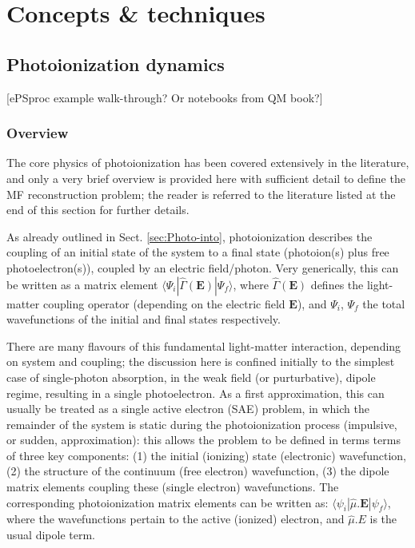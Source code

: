 \section{Concepts \& techniques\label{sec:Concepts}}

\subsection{Photoionization dynamics} 
[ePSproc example walk-through? Or notebooks from QM book?]

\subsubsection{Overview}
The core physics of photoionization has been covered extensively in the literature, and only a very brief overview is provided here with sufficient detail to define the MF reconstruction problem; the reader is referred to the literature listed at the end of this section for further details.

As already outlined in Sect. \ref{sec:Photo-into}, photoionization describes the coupling of an initial state of the system to a final state (photoion(s) plus free photoelectron(s)), coupled by an electric field/photon. Very generically, this can be written as a matrix element $\langle\Psi_i|\hat{\Gamma}(\boldsymbol{\mathbf{E}})|\Psi_f\rangle$, where $\hat{\Gamma}(\boldsymbol{\mathbf{E}})$ defines the light-matter coupling operator (depending on the electric field $\boldsymbol{\mathbf{E}}$), and $\Psi_i$, $\Psi_f$ the total wavefunctions of the initial and final states respectively. 

There are many flavours of this fundamental light-matter interaction, depending on system and coupling; the discussion here is confined initially to the simplest case of single-photon absorption, in the weak field (or purturbative), dipole regime, resulting in a single photoelectron.
As a first approximation, this can usually be treated as a single active electron (SAE) problem, in which the remainder of the system is static during the photoionization process (impulsive, or sudden, approximation): this allows the problem to be defined in terms terms of three key components: (1) the initial (ionizing) state (electronic) wavefunction, (2) the structure of the continuum (free electron) wavefunction, (3) the dipole matrix elements coupling these (single electron) wavefunctions. The corresponding photoionization matrix elements can be written as: $\langle\psi_i|\hat{\mu}.\boldsymbol{\mathbf{E}}|\psi_f\rangle$, where the wavefunctions pertain to the active (ionized) electron, and $\hat{\mu}.E$ is the usual dipole term.

